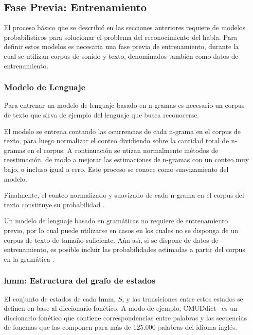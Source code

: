\subsection{Fase Previa: Entrenamiento}
\label{sec:training}

El proceso b\'asico que se describi\'o en las secciones anteriores requiere de modelos probabil{\'\i}sticos para
solucionar el problema del reconocimiento del habla. Para definir estos modelos es necesaria una
fase previa de entrenamiento, durante la cual se utilizan corpus de sonido y texto, denominados tambi\'en
como datos de entrenamiento.

\subsubsection{Modelo de Lenguaje}

Para entrenar un modelo de lenguaje basado en n-gramas es necesario un corpus de texto que 
sirva de ejemplo del lenguaje que busca reconocerse.

El modelo se entrena contando las ocurrencias de cada n-grama en el corpus de texto, para luego
normalizar el conteo dividiendo sobre la cantidad total de n-gramas en el corpus.
A continuaci\'on se utizan normalmente m\'etodos de reestimaci\'on, de modo a mejorar las estimaciones 
de n-gramas con un conteo muy bajo, o incluso igual a cero. Este proceso se conoce como suavizamiento
del modelo.

Finalmente, el conteo normalizado y suavizado de cada n-grama en el corpus del texto constituye su
probabilidad \cite{CollinsLanguage}.

Un modelo de lenguaje basado en gram\'aticas no requiere de entrenamiento previo, por lo cual puede
utilizarse en casos en los cuales no se disponga de un corpus de texto de tama\~no suficiente.
A\'un as{\'\i}, si se dispone de datos de entrenamiento, es posible incluir las probabilidades estimadas
a partir del corpus en la gram\'atica \cite{huang-handbook10}.

\subsubsection{\gls{hmm}: Estructura del grafo de estados}
El conjunto de estados de cada \gls{hmm}, $S$, y las transiciones entre estos estados se definen en base
al diccionario fon\'etico. A modo de ejemplo, \mbox{CMUDdict \cite{CMUdict}} es un diccionario fon\'etico
que contiene correspondencias entre palabras y las secuencias de fonemas que las componen para m\'as de
125.000 palabras del idioma ingl\'es.

